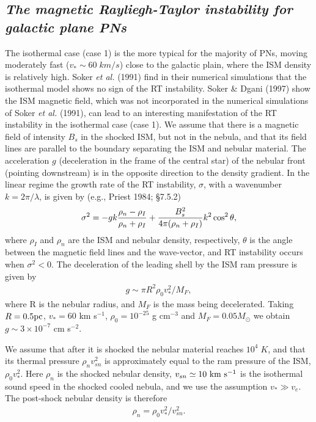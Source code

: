 \subsection{\it The magnetic Rayliegh-Taylor instability for galactic plane PNs}
The isothermal case (case 1) is the more typical for the majority of PNs,
moving moderately fast ($v_\ast\sim 60\;km/s$) close to the galactic plain,
where the ISM density is relatively high.
Soker {\it et al.} (1991) find in their numerical simulations that the
isothermal model shows no sign of the RT instability.
Soker \& Dgani (1997) show the ISM magnetic field, which was not incorporated in
the numerical simulations of Soker {\it et al.} (1991), can lead to an
interesting manifestation of the RT instability in the isothermal case (case 1).
We assume that there is a magnetic field of intensity $B_s$ in the shocked
ISM, but not in the nebula, and that its field lines are parallel to the
boundary separating the ISM and nebular material.
The acceleration $g$ (deceleration in the frame of the central star)
of the nebular front (pointing downstream) is in the opposite
direction to the density gradient.
In the linear regime the growth rate of the RT instability, $\sigma$, with a
wavenumber $k = 2 \pi / \lambda$, is given by (e.g., Priest 1984; \S 7.5.2)
\begin{eqnarray}
\sigma^2 = - g k {
{\rho_n-\rho_I}
\over
{\rho_n+\rho_I}}
+
{{B_s^2}\over{4 \pi ( \rho_n+\rho_I )}}
k^2 \cos^2 \theta,
\end{eqnarray} 
where $\rho_I$ and $\rho_n$ are the ISM and nebular density, respectively,
$\theta$ is the angle between the magnetic field lines and the
wave-vector, and RT instability occurs when $\sigma^2 < 0$.
The deceleration of the leading shell
{ { by the ISM ram pressure}} is given by
\begin{eqnarray}
g\sim \pi R^2 \rho_0 v_\ast^2/M_F,
\end{eqnarray}
where R is the nebular radius, and $M_F$ is the mass being decelerated.
Taking $R=0.5 \rm{pc}$, $v_\ast=60$ km s$^{-1}$, $\rho_0= 10^{-25}$ g cm$^{-3}$ and
$M_F=0.05 M_\odot$
we obtain $g \sim 3\times 10^{-7}$ cm s$^{-2}$.

We assume that after it is shocked the nebular material reaches
$10^4\;K$, and that its thermal pressure $\rho_n v_{sn}^2$ is approximately
equal to the ram pressure of the ISM, $\rho_0 v_\ast^2$. 
Here $\rho_{n}$ is the shocked nebular density,
$v_{sn} \simeq 10 ~\rm{km} ~\rm{s}^{-1}$ is the isothermal sound speed in the
shocked cooled nebula, and we use the assumption $v_\ast \gg v_e$. 
The post-shock nebular density is therefore
\begin{eqnarray}
\rho_{n} = \rho_0 v_\ast^2/ v_{sn}^2.
\end{eqnarray}

